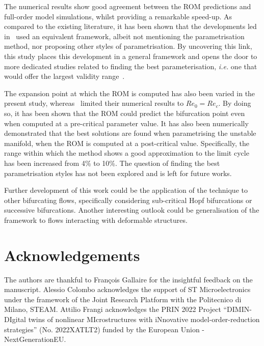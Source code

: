 \documentclass[%
reprint,
superscriptaddress,
 amsmath,amssymb,
 aps,
 pre
]{revtex4-2}
\begin{document}
The numerical results show good agreement between the ROM predictions and full-order model simulations, whilst providing a remarkable speed-up. As compared to the existing literature, it has been shown that the developments led in~\cite{Carini2015} used an equivalent framework, albeit not mentioning the parametrisation method, nor proposing other styles of parametrisation. By uncovering this link, this study places this development in a general framework and opens the door to more dedicated studies related to finding the best parameterisation, \textit{i.e.} one that would offer the largest validity range~\cite{Stoychev:failing}.

The expansion point at which the ROM is computed has also been varied in the present study, whereas~\cite{Carini2015} limited their numerical results to $Re_0 = Re_c$. By doing so, it has been shown that the ROM could predict the bifurcation point even when computed at a pre-critical parameter value. It has also been numerically demonstrated that the best solutions are found when parametrising the unstable manifold, when the ROM is computed at a post-critical value. Specifically, the range within which the method shows a good approximation to the limit cycle has been increased from 4\% to 10\%. The question of finding the best parametrisation styles has not been explored and is left for future works.


Further development of this work could be the application of the technique to other bifurcating flows, specifically considering sub-critical Hopf bifurcations or successive bifurcations. Another interesting outlook could be generalisation of the framework to flows interacting with deformable structures.











\section{Acknowledgements}
The authors are thankful to Fran\c{c}ois Gallaire for the insightful feedback on the manuscript.
Alessio Colombo acknowledges the support of ST Microelectronics under the framework of the Joint Research Platform with the Politecnico di Milano, STEAM.
Attilio Frangi acknowledges the PRIN 2022 Project “DIMIN- DIgital twins of nonlinear MIcrostructures with iNnovative model-order-reduction strategies” 
(No. 2022XATLT2) funded by the European Union - NextGenerationEU.
\end{document}
